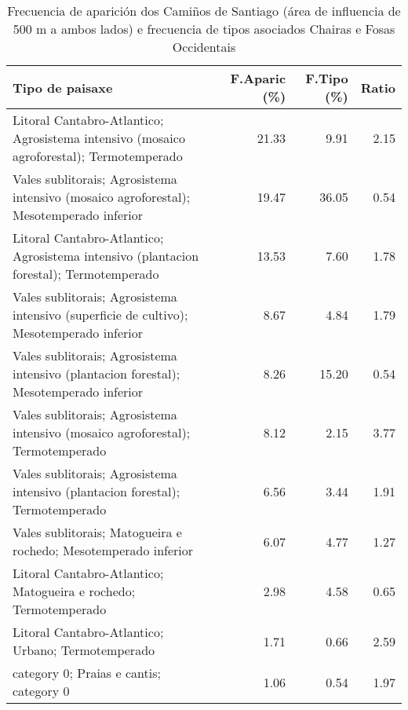 \begin{table}[p]
\centering
\caption{Frecuencia de aparición dos Camiños de Santiago (área de influencia de 500 m a ambos lados) e frecuencia de tipos asociados Chairas e Fosas Occidentais} 
\label{vcamino11}
\begin{tabular}{lrrr}
  \hline
Tipo de paisaxe & F.Aparic (\%) & F.Tipo (\%) & Ratio \\ 
  \hline
Litoral Cantabro-Atlantico; Agrosistema intensivo (mosaico agroforestal); Termotemperado & 21.33 & 9.91 & 2.15 \\ 
  Vales sublitorais; Agrosistema intensivo (mosaico agroforestal); Mesotemperado inferior & 19.47 & 36.05 & 0.54 \\ 
  Litoral Cantabro-Atlantico; Agrosistema intensivo (plantacion forestal); Termotemperado & 13.53 & 7.60 & 1.78 \\ 
  Vales sublitorais; Agrosistema intensivo (superficie de cultivo); Mesotemperado inferior & 8.67 & 4.84 & 1.79 \\ 
  Vales sublitorais; Agrosistema intensivo (plantacion forestal); Mesotemperado inferior & 8.26 & 15.20 & 0.54 \\ 
  Vales sublitorais; Agrosistema intensivo (mosaico agroforestal); Termotemperado & 8.12 & 2.15 & 3.77 \\ 
  Vales sublitorais; Agrosistema intensivo (plantacion forestal); Termotemperado & 6.56 & 3.44 & 1.91 \\ 
  Vales sublitorais; Matogueira e rochedo; Mesotemperado inferior & 6.07 & 4.77 & 1.27 \\ 
  Litoral Cantabro-Atlantico; Matogueira e rochedo; Termotemperado & 2.98 & 4.58 & 0.65 \\ 
  Litoral Cantabro-Atlantico; Urbano; Termotemperado & 1.71 & 0.66 & 2.59 \\ 
  category 0; Praias e cantis; category 0 & 1.06 & 0.54 & 1.97 \\ 
   \hline
\end{tabular}
\end{table}
